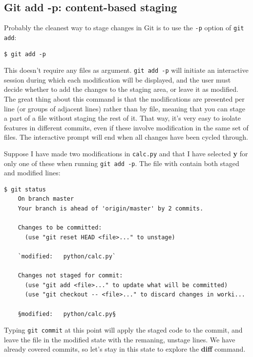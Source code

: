 \documentclass[a4paper]{../../common/tufte-latex/tufte-handout}
\begin{document}
\subsection{Git add -p: content-based staging}

Probably the cleanest way to stage changes in Git is to use the \texttt{-p} option of \texttt{git add}:

\begin{lstlisting}[style=BashInputStyle]
  $ git add -p
\end{lstlisting}

This doesn't require any files as argument.
\texttt{git add -p} will initiate an interactive session during which each modification will be displayed, and the user must decide whether to add the changes to the staging area, or leave it as modified. 
The great thing about this command is that the modifications are presented per line (or groups of adjacent lines) rather than by file, meaning that you can stage a part of a file without staging the rest of it.
That way, it's very easy to isolate features in different commits, even if these involve modification in the same set of files.
The interactive prompt will end when all changes have been cycled through.

Suppose I have made two modifications in \texttt{calc.py} and that I have selected \textbf{y} for only one of these when running \texttt{git add -p}.
The file with contain both staged and modified lines:

\begin{lstlisting}[style=BashInputStyle]
  $ git status
    On branch master
    Your branch is ahead of 'origin/master' by 2 commits.
  
    Changes to be committed:
      (use "git reset HEAD <file>..." to unstage)
  
    `modified:   python/calc.py`
  
    Changes not staged for commit:
      (use "git add <file>..." to update what will be committed)
      (use "git checkout -- <file>..." to discard changes in worki...
  
    §modified:   python/calc.py§
\end{lstlisting}

Typing \texttt{git commit} at this point will apply the staged code to the commit, and leave the file in the modified state with the remaning, unstage lines.
We have already covered commits, so let's stay in this state to explore the \textbf{diff} command.
\end{document}
